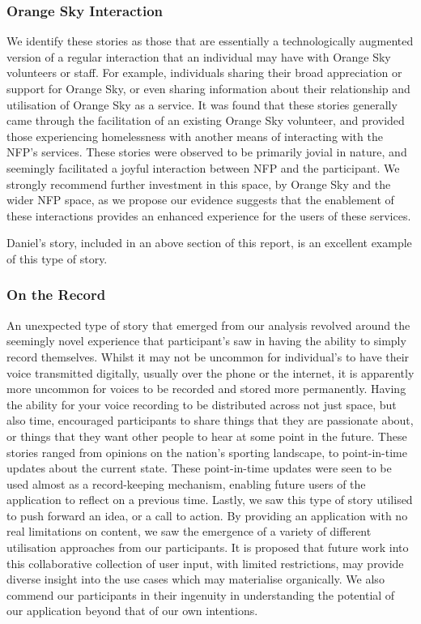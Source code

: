 \subsubsection{Orange Sky Interaction}

We identify these stories as those that are essentially a technologically augmented version of a regular interaction that an individual may have with Orange Sky volunteers or staff. For example, individuals sharing their broad appreciation or support for Orange Sky, or even sharing information about their relationship and utilisation of Orange Sky as a service. It was found that these stories generally came through the facilitation of an existing Orange Sky volunteer, and provided those experiencing homelessness with another means of interacting with the NFP's services. These stories were observed to be primarily jovial in nature, and seemingly facilitated a joyful interaction between NFP and the participant. We strongly recommend further investment in this space, by Orange Sky and the wider NFP space, as we propose our evidence suggests that the enablement of these interactions provides an enhanced experience for the users of these services.

Daniel's story, included in an above section of this report, is an excellent example of this type of story.

\subsubsection{On the Record}

An unexpected type of story that emerged from our analysis revolved around the seemingly novel experience that participant's saw in having the ability to simply record themselves. Whilst it may not be uncommon for individual's to have their voice transmitted digitally, usually over the phone or the internet, it is apparently more uncommon for voices to be recorded and stored more permanently. Having the ability for your voice recording to be distributed across not just space, but also time, encouraged participants to share things that they are passionate about, or things that they want other people to hear at some point in the future. These stories ranged from opinions on the nation's sporting landscape, to point-in-time updates about the current state. These point-in-time updates were seen to be used almost as a record-keeping mechanism, enabling future users of the application to reflect on a previous time. Lastly, we saw this type of story utilised to push forward an idea, or a call to action. By providing an application with no real limitations on content, we saw the emergence of a variety of different utilisation approaches from our participants. It is proposed that future work into this collaborative collection of user input, with limited restrictions, may provide diverse insight into the use cases which may materialise organically. We also commend our participants in their ingenuity in understanding the potential of our application beyond that of our own intentions.

